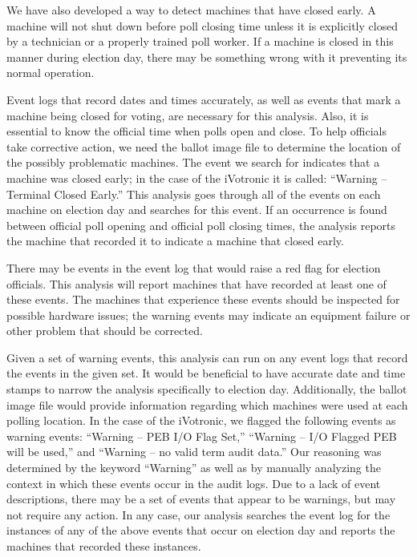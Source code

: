 We have also developed a way to detect machines that have closed early. A
machine will not shut down before poll closing time unless it is explicitly
closed by a technician or a properly trained poll worker. If a machine is closed
in this manner during election day, there may be something wrong with it
preventing its normal operation.
                  
Event logs that record dates and times accurately, as well as events
that mark a machine being closed for voting, are necessary for this
analysis. Also, it is essential to know the official time when polls
open and close. To help officials take corrective action, we need the
ballot image file to determine the location of the possibly
problematic machines. The event we search for indicates that a machine
was closed early; in the case of the iVotronic it is called:
\textquotedblleft Warning -- Terminal Closed
Early.\textquotedblright \hspace{2 mm} This analysis goes through all
of the events on each machine on election day and searches for this
event. If an occurrence is found between official poll opening and
official poll closing times, the analysis reports the machine that
recorded it to indicate a machine that closed early.  

There may be events in the event log that would raise a red flag for election officials. This analysis will report machines that have recorded at least one of these events. The machines that experience these events should be inspected for possible hardware issues; the warning events may indicate an equipment failure or other problem that should be corrected.

Given a set of warning events, this analysis can run on any event logs that record the events in the given set. It would be beneficial to have accurate date and time stamps to narrow the analysis specifically to election day. Additionally, the ballot image file would provide information regarding which machines were used at each polling location.  In the case of the iVotronic, we flagged the following events as warning events: \textquotedblleft Warning -- PEB I/O Flag Set,\textquotedblright \hspace{1 mm} \textquotedblleft Warning -- I/O Flagged PEB will be used,\textquotedblright \hspace{1 mm} and \textquotedblleft Warning -- no valid term audit data.\textquotedblright \hspace{2 mm} Our reasoning was determined by the keyword \textquotedblleft Warning\textquotedblright \hspace{1 mm} as well as by manually analyzing the context in which these events occur in the audit logs. Due to a lack of event descriptions, there may be a set of events that appear to be warnings, but may not require any action. In any case, our analysis searches the event log for the instances of any of the above events that occur on election day and reports the machines that recorded these instances. 
